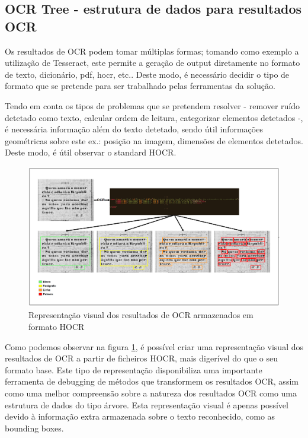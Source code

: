 \subsection{OCR Tree - estrutura de dados para resultados OCR}

Os resultados de OCR podem tomar múltiplas formas; tomando como exemplo a utilização de Tesseract, este permite a geração de output diretamente no formato de texto, dicionário, pdf, hocr, etc.. Deste modo, é necessário decidir o tipo de formato que se pretende para ser trabalhado pelas ferramentas da solução.

Tendo em conta os tipos de problemas que se pretendem resolver - remover ruído detetado como texto, calcular ordem de leitura, categorizar elementos detetados -, é necessária informação além do texto detetado, sendo útil informações geométricas sobre este ex.: posição na imagem, dimensões de elementos detetados. Deste modo, é útil observar o standard HOCR.

\begin{figure}[H]
	\centering
	\includegraphics[width=1\textwidth]{images/ilustracoes/hocr_visual_representation.png}
	\caption{Representação visual dos resultados de OCR armazenados em formato HOCR}
	\label{fig:hocr_visual_representation}
\end{figure}


Como podemos observar na figura \ref{fig:hocr_visual_representation}, é possível criar uma representação visual dos resultados de OCR a partir de ficheiros HOCR, mais digerível do que o seu formato base. Este tipo de representação disponibiliza uma importante ferramenta de debugging de métodos que transformem os resultados OCR, assim como uma melhor compreensão sobre a natureza dos resultados OCR como uma estrutura de dados do tipo árvore. Esta representação visual é apenas possível devido à informação extra armazenada sobre o texto reconhecido, como as bounding boxes.

